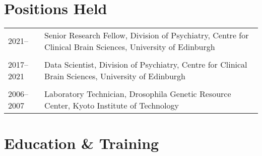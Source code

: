 \documentclass[11pt]{article}
\begin{document}

\noindent{\rule{\textwidth}{1pt}} \\


\section*{Positions Held}

\begin{tabular}{p{3cm}p{12cm}}
2021-- & Senior Research Fellow, Division of Psychiatry, Centre for Clinical Brain Sciences, University of Edinburgh \\ \\

2017--2021 & Data Scientist, Division of Psychiatry, Centre for Clinical Brain Sciences, University of Edinburgh \\ \\

2006--2007 & Laboratory Technician, Drosophila Genetic Resource Center, Kyoto Institute of Technology

\end{tabular}

\section*{Education \& Training}
\end{document}
